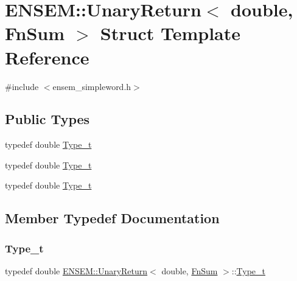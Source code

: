 \hypertarget{structENSEM_1_1UnaryReturn_3_01double_00_01FnSum_01_4}{}\section{E\+N\+S\+EM\+:\+:Unary\+Return$<$ double, Fn\+Sum $>$ Struct Template Reference}
\label{structENSEM_1_1UnaryReturn_3_01double_00_01FnSum_01_4}


{\ttfamily \#include $<$ensem\+\_\+simpleword.\+h$>$}

\subsection*{Public Types}
\begin{DoxyCompactItemize}
\item 
typedef double \mbox{\hyperlink{structENSEM_1_1UnaryReturn_3_01double_00_01FnSum_01_4_ad107c064fb27f30146a624a7378978bb}{Type\+\_\+t}}
\item 
typedef double \mbox{\hyperlink{structENSEM_1_1UnaryReturn_3_01double_00_01FnSum_01_4_ad107c064fb27f30146a624a7378978bb}{Type\+\_\+t}}
\item 
typedef double \mbox{\hyperlink{structENSEM_1_1UnaryReturn_3_01double_00_01FnSum_01_4_ad107c064fb27f30146a624a7378978bb}{Type\+\_\+t}}
\end{DoxyCompactItemize}


\subsection{Member Typedef Documentation}
\mbox{\label{structENSEM_1_1UnaryReturn_3_01double_00_01FnSum_01_4_ad107c064fb27f30146a624a7378978bb}} 
\subsubsection{\texorpdfstring{Type\_t}{Type\_t}\hspace{0.1cm}{\footnotesize\ttfamily [1/3]}}
{\footnotesize\ttfamily typedef double \mbox{\hyperlink{structENSEM_1_1UnaryReturn}{E\+N\+S\+E\+M\+::\+Unary\+Return}}$<$ double, \mbox{\hyperlink{structENSEM_1_1FnSum}{Fn\+Sum}} $>$\+::\mbox{\hyperlink{structENSEM_1_1UnaryReturn_3_01double_00_01FnSum_01_4_ad107c064fb27f30146a624a7378978bb}{Type\+\_\+t}}}

